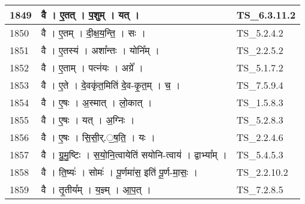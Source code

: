 \documentclass[17pt]{extarticle}
\begin{document}
\begin{longtable}{||p{0.4in}||p{4.9in}||p{0.9in}||}
    \hline
        
    1849 & वै   ।   ए॒तत्   ।   प॒शुम्   ।   यत्   ।    & TS\_6.3.11.2       \\
    
    \hline
        
    1850 & वै   ।   ए॒तम्   ।   दी॒क्ष॒य॒न्ति॒   ।   सः   ।    & TS\_5.2.4.2       \\
    
    \hline
        
    1851 & वै   ।   ए॒तस्य॑   ।   अशा᳚न्तः   ।   योनि᳚म्   ।    & TS\_2.2.5.2       \\
    
    \hline
        
    1852 & वै   ।   ए॒ताम्   ।   पत्न॑यः   ।   अग्रे᳚   ।    & TS\_5.1.7.2       \\
    
    \hline
        
    1853 & वै   ।   ए॒ते   ।   दे॒वकृ॑त॒मिति॑ दे॒व{-}कृ॒त॒म्   ।   च॒   ।    & TS\_7.5.9.4       \\
    
    \hline
        
    1854 & वै   ।   ए॒षः   ।   अ॒स्मात्   ।   लो॒कात्   ।    & TS\_1.5.8.3       \\
    
    \hline
        
    1855 & वै   ।   ए॒षः   ।   यत्   ।   अ॒ग्निः   ।    & TS\_5.2.8.3       \\
    
    \hline
        
    1856 & वै   ।   ए॒षः   ।   सि॒सी॒र्.॒ष॒ति॒   ।   यः   ।    & TS\_2.2.4.6       \\
    
    \hline
        
    1857 & वै   ।   ग्रु॒मु॒ष्टिः   ।   स॒यो॒नि॒त्वायेति॑ सयोनि{-}त्वाय॑   ।   द्वाभ्या᳚म्   ।    & TS\_5.4.5.3       \\
    
    \hline
        
    1858 & वै   ।   ति॒ष्यः॑   ।   सोमः॑   ।   पू॒र्णमा॑स॒ इति॑ पू॒र्ण{-}मा॒सः॒   ।    & TS\_2.2.10.2       \\
    
    \hline
        
    1859 & वै   ।   तृ॒तीय᳚म्   ।   य॒ज्ञ्म्   ।   आ॒प॒त्   ।    & TS\_7.2.8.5       \\
    

\end{longtable}
\end{document}
